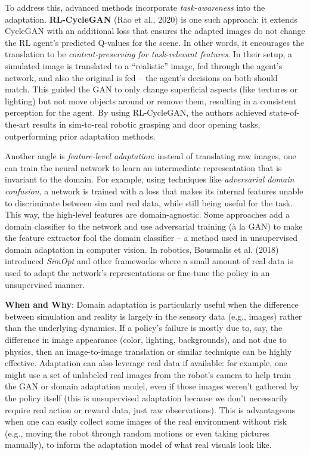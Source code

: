 To address this, advanced methods incorporate \textit{task-awareness} into the adaptation. \textbf{RL-CycleGAN} (Rao et al., 2020) is one such approach: it extends CycleGAN with an additional loss that ensures the adapted images do not change the RL agent’s predicted Q-values for the scene. In other words, it encourages the translation to be \textit{content-preserving for task-relevant features}. In their setup, a simulated image is translated to a “realistic” image, fed through the agent’s network, and also the original is fed – the agent’s decisions on both should match. This guided the GAN to only change superficial aspects (like textures or lighting) but not move objects around or remove them, resulting in a consistent perception for the agent. By using RL-CycleGAN, the authors achieved state-of-the-art results in sim-to-real robotic grasping and door opening tasks, outperforming prior adaptation methods.

Another angle is \textit{feature-level adaptation}: instead of translating raw images, one can train the neural network to learn an intermediate representation that is invariant to the domain. For example, using techniques like \textit{adversarial domain confusion}, a network is trained with a loss that makes its internal features unable to discriminate between sim and real data, while still being useful for the task. This way, the high-level features are domain-agnostic. Some approaches add a domain classifier to the network and use adversarial training (à la GAN) to make the feature extractor fool the domain classifier – a method used in unsupervised domain adaptation in computer vision. In robotics, Bousmalis et al. (2018) introduced \textit{SimOpt} and other frameworks where a small amount of real data is used to adapt the network’s representations or fine-tune the policy in an unsupervised manner.

\textbf{When and Why}: Domain adaptation is particularly useful when the difference between simulation and reality is largely in the sensory data (e.g., images) rather than the underlying dynamics. If a policy’s failure is mostly due to, say, the difference in image appearance (color, lighting, backgrounds), and not due to physics, then an image-to-image translation or similar technique can be highly effective. Adaptation can also leverage real data if available: for example, one might use a set of unlabeled real images from the robot’s camera to help train the GAN or domain adaptation model, even if those images weren’t gathered by the policy itself (this is unsupervised adaptation because we don’t necessarily require real action or reward data, just raw observations). This is advantageous when one can easily collect some images of the real environment without risk (e.g., moving the robot through random motions or even taking pictures manually), to inform the adaptation model of what real visuals look like.


